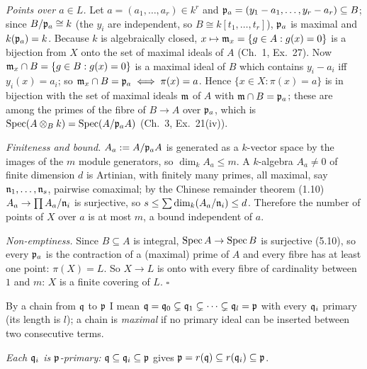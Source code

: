 \documentclass[11pt]{article}
\begin{document}
\emph{Points over $a\in L$.} Let $a=(a_1,\dots,a_r)\in k^r$ and $\mathfrak p_a=(y_1-a_1,\dots,y_r-a_r)\subseteq B$; since $B/\mathfrak p_a\cong k$ (the $y_i$ are independent, so $B\cong k[t_1,\dots,t_r]$), $\mathfrak p_a$ is maximal and $k(\mathfrak p_a)=k$. Because $k$ is algebraically closed, $x\mapsto\mathfrak m_x=\{g\in A:g(x)=0\}$ is a bijection from $X$ onto the set of maximal ideals of $A$ (Ch.~1, Ex.~27). Now $\mathfrak m_x\cap B=\{g\in B:g(x)=0\}$ is a maximal ideal of $B$ which contains $y_i-a_i$ iff $y_i(x)=a_i$; so $\mathfrak m_x\cap B=\mathfrak p_a\iff\pi(x)=a$. Hence $\{x\in X:\pi(x)=a\}$ is in bijection with the set of maximal ideals $\mathfrak m$ of $A$ with $\mathfrak m\cap B=\mathfrak p_a$; these are among the primes of the fibre of $B\to A$ over $\mathfrak p_a$, which is $\operatorname{Spec}(A\otimes_Bk)=\operatorname{Spec}(A/\mathfrak p_aA)$ (Ch.~3, Ex.~21(iv)).

\emph{Finiteness and bound.} $A_a:=A/\mathfrak p_aA$ is generated as a $k$-vector space by the images of the $m$ module generators, so $\dim_kA_a\le m$. A $k$-algebra $A_a\ne0$ of finite dimension $d$ is Artinian, with finitely many primes, all maximal, say $\mathfrak n_1,\dots,\mathfrak n_s$, pairwise comaximal; by the Chinese remainder theorem (1.10) $A_a\to\prod A_a/\mathfrak n_i$ is surjective, so $s\le\sum\dim_k(A_a/\mathfrak n_i)\le d$. Therefore the number of points of $X$ over $a$ is at most $m$, a bound independent of $a$.

\emph{Non-emptiness.} Since $B\subseteq A$ is integral, $\operatorname{Spec} A\to\operatorname{Spec} B$ is surjective (5.10), so every $\mathfrak p_a$ is the contraction of a (maximal) prime of $A$ and every fibre has at least one point: $\pi(X)=L$. So $X\to L$ is onto with every fibre of cardinality between $1$ and $m$: $X$ is a finite covering of $L$. \hfill$\square$

\pf
By a chain from $\mathfrak q$ to $\mathfrak p$ I mean $\mathfrak q=\mathfrak q_0\subsetneq\mathfrak q_1\subsetneq\cdots\subsetneq\mathfrak q_l=\mathfrak p$ with every $\mathfrak q_i$ primary (its length is $l$); a chain is \emph{maximal} if no primary ideal can be inserted between two consecutive terms.

\emph{Each $\mathfrak q_i$ is $\mathfrak p$-primary:} $\mathfrak q\subseteq\mathfrak q_i\subseteq\mathfrak p$ gives $\mathfrak p=r(\mathfrak q)\subseteq r(\mathfrak q_i)\subseteq\mathfrak p$.
\end{document}
